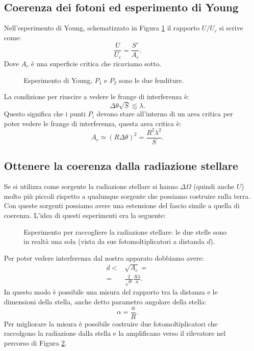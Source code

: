 \subsection{Coerenza dei fotoni ed esperimento di Young}
\label{subsec:Coerenza dei fotoni ed esperimento di Young}
Nell'esperimento di Young, schematizzato in Figura \ref{fig:esperimento-di-young} il rapporto $U /U_c$ si scrive come:
\[
	\frac{U}{U_c} = \frac{S'}{A_c}
.\] 
Dove $A_c$ è una superficie critica che ricaviamo sotto.
\begin{figure}[H]
    \centering
    \caption{Esperimento di Young, $P_1$ e $P_2$ sono le due fenditure.}
    \label{fig:esperimento-di-young}
\end{figure}
\noindent
La condizione per riuscire a vedere le frange di interferenza è:
\[
	\Delta \theta \sqrt{S}  \lesssim \lambda 
.\] 
Questo significa che i punti $P_i$ devono stare all'interno di un area critica per poter vedere le frange di interferenza, questa area critica è:
\[
	A_c \simeq \left( R \Delta \theta  \right)^2 =
	\frac{R^2 \lambda ^2}{S}
.\] 

\subsection{Ottenere la coerenza dalla radiazione stellare}
\label{subsec:Ottenere la coerenza dalla radiazione stellare}
Se si utilizza come sorgente la radiazione stellare si hanno $\Delta \Omega $ (quindi anche $U$) molto più piccoli rispetto a qualunque sorgente che possiamo costruire sulla terra.\\
Con queste sorgenti possiamo avere una estensione del fascio simile a quella di coerenza. L'idea di questi esperimenti era la seguente:
\begin{figure}[H]
    \centering
    \caption{Esperimento per raccogliere la radiazione stellare: le due stelle sono in realtà una sola (vista da sue fotomoltiplicatori a distanda $d$).}
    \label{fig:esperimento-per-raccogliere-la-radiazione-stellare}
\end{figure}
\noindent
Per poter vedere interferenza dal nostro apparato dobbiamo avere:
\[\begin{aligned}
	 d 
	 <&
	 \sqrt{A_c} =\\
	 =& \frac{2}{\sqrt{\pi}}\frac{R\lambda }{a}
.\end{aligned}\]
In questo modo è possibile una misura del rapporto tra la distanza e le dimensioni della stella, anche detto parametro angolare della stella:
\[
	\alpha = \frac{a}{R}
.\] 
Per migliorare la misura è possibile costruire due fotomoltiplicatori che raccolgono la radiazione dalla stella e la amplificano verso il rilevatore nel percorso di Figura \ref{fig:esperimento-per-raccogliere-la-radiazione-stellare}.
